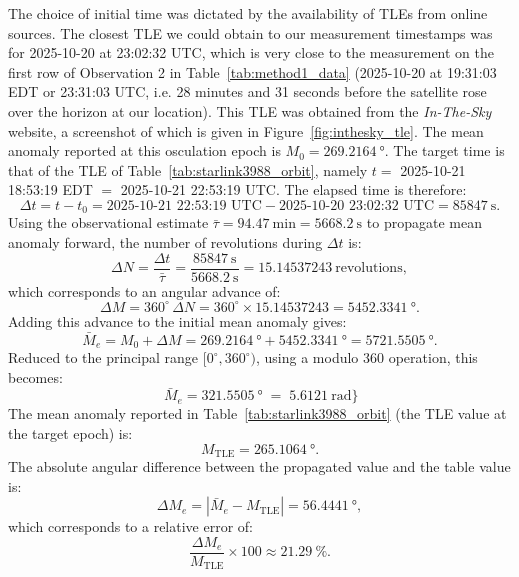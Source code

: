 \documentclass{article}
\begin{document}
The choice of initial time was dictated by the availability of TLEs from online sources. The closest TLE we could obtain to our measurement timestamps was for 2025-10-20 at 23:02:32 UTC, which is very close to the measurement on the first row of Observation 2 in Table~\ref{tab:method1_data} (2025-10-20 at 19:31:03 EDT or 23:31:03 UTC, i.e. 28 minutes and 31 seconds before the satellite rose over the horizon at our location). This TLE was obtained from the \textit{In-The-Sky} website, a screenshot of which is given in Figure~\ref{fig:inthesky_tle}. The mean anomaly reported at this osculation epoch is \(M_{0}=\SI{269.2164}{\degree}\). The target time is that of the TLE of Table~\ref{tab:starlink3988_orbit}, namely \(t=\) 2025-10-21 18:53:19 EDT \(=\) 2025-10-21 22:53:19 UTC. The elapsed time is therefore:
\[
\Delta t = t - t_{0}
= \text{2025-10-21 22:53:19 UTC} - \text{2025-10-20 23:02:32 UTC}
= \SI{85847}{\second}.
\]
Using the observational estimate \(\bar{\tau}=\SI{94.47}{\minute}=\SI{5668.2}{\second}\) to propagate mean anomaly forward, the number of revolutions during \(\Delta t\) is:
\[
\Delta N = \frac{\Delta t}{\bar{\tau}}
= \frac{\SI{85847}{\second}}{\SI{5668.2}{\second}}
= \num{15.14537243}\ \text{revolutions},
\]
which corresponds to an angular advance of:
\[
\Delta M = 360^\circ\,\Delta N
= 360^\circ\times\num{15.14537243}
= \SI{5452.3341}{\degree}.
\]
Adding this advance to the initial mean anomaly gives:
\[
\bar{M}_{e} = M_{0} + \Delta M
= \SI{269.2164}{\degree} + \SI{5452.3341}{\degree}
= \SI{5721.5505}{\degree}.
\]
Reduced to the principal range \([0^\circ,360^\circ)\), using a modulo 360 operation, this becomes:
\[
\boxed{\,\bar{M}_{e} = \SI{321.5505}{\degree} \;=\; \SI{5.6121}{\radian}\}}
\]
The mean anomaly reported in Table~\ref{tab:starlink3988_orbit} (the TLE value at the target epoch) is:
\[
M_{\text{TLE}} = \SI{265.1064}{\degree}.
\]
The absolute angular difference between the propagated value and the table value is:
\[
\Delta M_e = |\bar{M}_{e} - M_{\text{TLE}}| = \SI{56.4441}{\degree},
\]
which corresponds to a relative error of:
\[
\frac{\Delta M_e}{M_{\text{TLE}}}\times 100 \approx \SI{21.29}{\percent}.
\]
\end{document}
